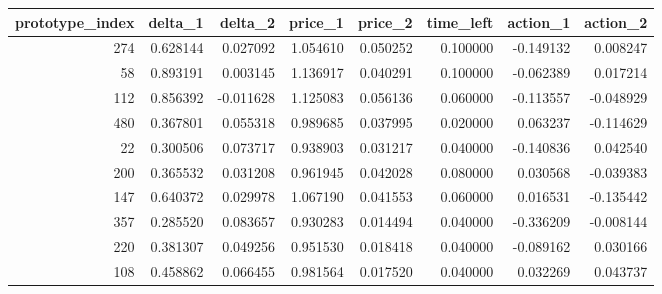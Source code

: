 \begin{tabular}{rrrrrrrr}
\toprule
prototype_index & delta_1 & delta_2 & price_1 & price_2 & time_left & action_1 & action_2 \\
\midrule
274 & 0.628144 & 0.027092 & 1.054610 & 0.050252 & 0.100000 & -0.149132 & 0.008247 \\
58 & 0.893191 & 0.003145 & 1.136917 & 0.040291 & 0.100000 & -0.062389 & 0.017214 \\
112 & 0.856392 & -0.011628 & 1.125083 & 0.056136 & 0.060000 & -0.113557 & -0.048929 \\
480 & 0.367801 & 0.055318 & 0.989685 & 0.037995 & 0.020000 & 0.063237 & -0.114629 \\
22 & 0.300506 & 0.073717 & 0.938903 & 0.031217 & 0.040000 & -0.140836 & 0.042540 \\
200 & 0.365532 & 0.031208 & 0.961945 & 0.042028 & 0.080000 & 0.030568 & -0.039383 \\
147 & 0.640372 & 0.029978 & 1.067190 & 0.041553 & 0.060000 & 0.016531 & -0.135442 \\
357 & 0.285520 & 0.083657 & 0.930283 & 0.014494 & 0.040000 & -0.336209 & -0.008144 \\
220 & 0.381307 & 0.049256 & 0.951530 & 0.018418 & 0.040000 & -0.089162 & 0.030166 \\
108 & 0.458862 & 0.066455 & 0.981564 & 0.017520 & 0.040000 & 0.032269 & 0.043737 \\
\bottomrule
\end{tabular}
